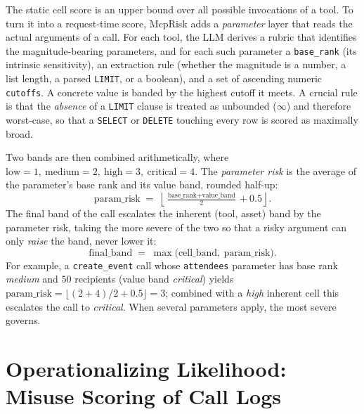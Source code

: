 The static cell score is an upper bound over all possible invocations of a tool.
To turn it into a request-time score, McpRisk adds a \emph{parameter} layer that
reads the actual arguments of a call. For each tool, the LLM derives a rubric
that identifies the magnitude-bearing parameters, and for each such parameter a
\texttt{base\_rank} (its intrinsic sensitivity), an extraction rule (whether the
magnitude is a number, a list length, a parsed \texttt{LIMIT}, or a boolean),
and a set of ascending numeric \texttt{cutoffs}. A concrete value is banded by
the highest cutoff it meets. A crucial rule is that the \emph{absence} of a
\texttt{LIMIT} clause is treated as unbounded ($\infty$) and therefore
worst-case, so that a \texttt{SELECT} or \texttt{DELETE} touching every row is
scored as maximally broad.

Two bands are then combined arithmetically, where
$\text{low}=1,\ \text{medium}=2,\ \text{high}=3,\ \text{critical}=4$. The
\emph{parameter risk} is the average of the parameter's base rank and its value
band, rounded half-up:
\begin{equation}
\text{param\_risk} \;=\; \left\lfloor \tfrac{\text{base\_rank} +
\text{value\_band}}{2} + 0.5 \right\rfloor .
\label{eq:paramavg}
\end{equation}
The final band of the call escalates the inherent (tool, asset) band by the
parameter risk, taking the more severe of the two so that a risky argument can
only \emph{raise} the band, never lower it:
\begin{equation}
\text{final\_band} \;=\; \max\!\big(\text{cell\_band},\ \text{param\_risk}\big).
\label{eq:escalate}
\end{equation}
For example, a \texttt{create\_event} call whose \texttt{attendees} parameter has
base rank \textit{medium} and $50$ recipients (value band \textit{critical})
yields $\text{param\_risk}=\lfloor(2+4)/2+0.5\rfloor=3$; combined with a
\textit{high} inherent cell this escalates the call to \textit{critical}. When
several parameters apply, the most severe governs.

\section{Operationalizing Likelihood: Misuse Scoring of Call Logs}
\label{sec:framework:misuse}

